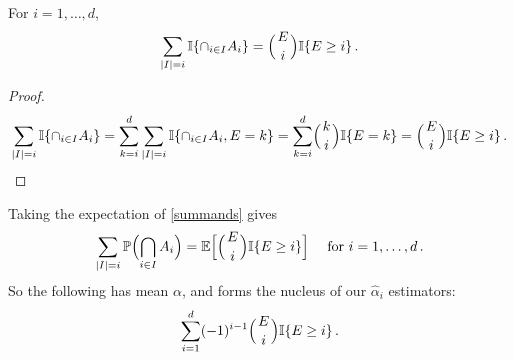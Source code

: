 \begin{proposition} \label{prop:means_of_binomial}
For $i = 1,\dots, d$,
\begin{equation} \label{summands}
  \sum_{\card{I}=i} \ind{\cap_{i\in I}A_i} = \BigBinom{E}{i} \ind{E \ge i}  \,.
\end{equation}
\end{proposition}
\begin{proof}
\begin{align*}
\sum_{\card{I}=i} \ind{ \cap_{i\in I}A_i } =
\sum_{k=i}^{d} \sum_{\card{I}=i} \ind{ \cap_{i\in I}A_i, E = k }
= \sum_{k=i}^{d} \BigBinom{k}{i} \ind{E = k }
= \BigBinom{E}{i} \ind{E \ge i} \,.
\end{align*}
\end{proof}
Taking the expectation of \eqref{summands} gives
\begin{equation*}
 \sum_{\card{I}=i} \Prob\Bigl(\bigcap_{i\in I}A_i\Bigr) = \Exp\Bigl[ \BigBinom{E}{i} \ind{E \ge i} \Bigr] \quad \text{ for } i=1,\dots,d \,.
\end{equation*}
So the following has mean $\alpha$, and forms the nucleus of our $\hat{\alpha}_i$ estimators:
\begin{equation} \label{estimator_incl_excl}
	\sum_{i=1}^d (-1)^{i-1} \BigBinom{E}{i} \ind{E\ge i} \,.
\end{equation}

